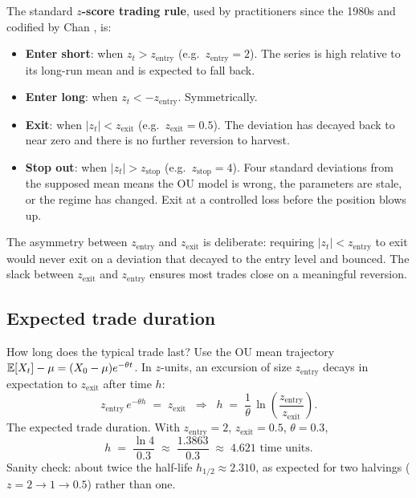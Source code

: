 The standard \textbf{$z$-score trading rule}, used by
practitioners since the 1980s and codified by Chan
\citeChan{}, is:
\begin{itemize}
  \item \textbf{Enter short}: when $z_t > z_{\text{entry}}$
  (e.g.\ $z_{\text{entry}} = 2$). The series is high relative
  to its long-run mean and is expected to fall back.
  \item \textbf{Enter long}: when $z_t < -z_{\text{entry}}$.
  Symmetrically.
  \item \textbf{Exit}: when $|z_t| < z_{\text{exit}}$ (e.g.\
  $z_{\text{exit}} = 0.5$). The deviation has decayed back to
  near zero and there is no further reversion to harvest.
  \item \textbf{Stop out}: when $|z_t| > z_{\text{stop}}$ (e.g.\
  $z_{\text{stop}} = 4$). Four standard deviations from the
  supposed mean means the OU model is wrong, the parameters are
  stale, or the regime has changed. Exit at a controlled loss
  before the position blows up.
\end{itemize}
The asymmetry between $z_{\text{entry}}$ and $z_{\text{exit}}$
is deliberate: requiring $|z_t| < z_{\text{entry}}$ to exit would
never exit on a deviation that decayed to the entry level and
bounced. The slack between $z_{\text{exit}}$ and
$z_{\text{entry}}$ ensures most trades close on a meaningful
reversion.

\subsection{Expected trade duration}
\label{subsec:ch9_duration}

How long does the typical trade last? Use the OU mean trajectory
$\mathbb{E}[X_t] - \mu = (X_0 - \mu)e^{-\theta t}$. In $z$-units, an
excursion of size $z_{\text{entry}}$ decays in expectation to
$z_{\text{exit}}$ after time $h$:
\begin{equation}
  z_{\text{entry}}\,e^{-\theta h} \;=\; z_{\text{exit}}
  \;\;\Longrightarrow\;\;
  h \;=\; \frac{1}{\theta}\,\ln\!\left(\frac{z_{\text{entry}}}{z_{\text{exit}}}\right).
  \label{eq:zscore_duration}
\end{equation}
The expected trade duration. With $z_{\text{entry}} = 2$,
$z_{\text{exit}} = 0.5$, $\theta = 0.3$,
\begin{equation}
  h \;=\; \frac{\ln 4}{0.3}
       \;\approx\; \frac{1.3863}{0.3}
       \;\approx\; 4.621 \text{ time units}.
  \label{eq:ch9_worked_duration}
\end{equation}
Sanity check: about twice the half-life
$h_{1/2} \approx 2.310$, as expected for two halvings
($z = 2 \to 1 \to 0.5$) rather than one.

